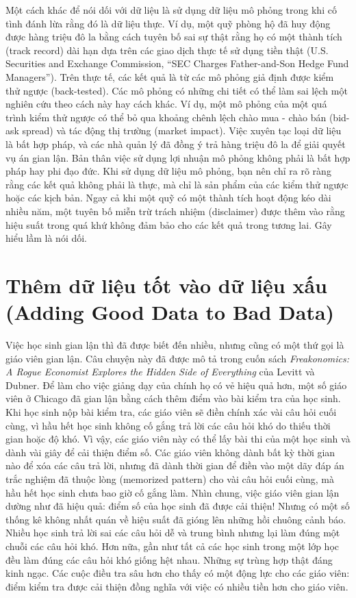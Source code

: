 Một cách khác để nói dối với dữ liệu là sử dụng dữ liệu mô phỏng trong khi cố tình đánh lừa rằng đó là dữ liệu thực. Ví dụ, một quỹ phòng hộ đã huy động được hàng triệu đô la bằng cách tuyên bố sai sự thật rằng họ có một thành tích (track record) dài hạn dựa trên các giao dịch thực tế sử dụng tiền thật (U.S. Securities and Exchange Commission, ``SEC Charges Father-and-Son Hedge Fund Managers''). Trên thực tế, các kết quả là từ các mô phỏng giả định được kiểm thử ngược (back-tested). Các mô phỏng có những chi tiết có thể làm sai lệch một nghiên cứu theo cách này hay cách khác. Ví dụ, một mô phỏng của một quá trình kiểm thử ngược có thể bỏ qua khoảng chênh lệch chào mua - chào bán (bid-ask spread) và tác động thị trường (market impact). Việc xuyên tạc loại dữ liệu là bất hợp pháp, và các nhà quản lý đã đồng ý trả hàng triệu đô la để giải quyết vụ án gian lận. Bản thân việc sử dụng lợi nhuận mô phỏng không phải là bất hợp pháp hay phi đạo đức. Khi sử dụng dữ liệu mô phỏng, bạn nên chỉ ra rõ ràng rằng các kết quả không phải là thực, mà chỉ là sản phẩm của các kiểm thử ngược hoặc các kịch bản. Ngay cả khi một quỹ có một thành tích hoạt động kéo dài nhiều năm, một tuyên bố miễn trừ trách nhiệm (disclaimer) được thêm vào rằng hiệu suất trong quá khứ không đảm bảo cho các kết quả trong tương lai. Gây hiểu lầm là nói dối.

\section{Thêm dữ liệu tốt vào dữ liệu xấu (Adding Good Data to Bad Data)}

Việc học sinh gian lận thì đã được biết đến nhiều, nhưng cũng có một thứ gọi là giáo viên gian lận. Câu chuyện này đã được mô tả trong cuốn sách \emph{Freakonomics: A Rogue Economist Explores the Hidden Side of Everything} của Levitt và Dubner. Để làm cho việc giảng dạy của chính họ có vẻ hiệu quả hơn, một số giáo viên ở Chicago đã gian lận bằng cách thêm điểm vào bài kiểm tra của học sinh. Khi học sinh nộp bài kiểm tra, các giáo viên sẽ điền chính xác vài câu hỏi cuối cùng, vì hầu hết học sinh không cố gắng trả lời các câu hỏi khó do thiếu thời gian hoặc độ khó. Vì vậy, các giáo viên này có thể lấy bài thi của một học sinh và dành vài giây để cải thiện điểm số. Các giáo viên không dành bất kỳ thời gian nào để xóa các câu trả lời, nhưng đã dành thời gian để điền vào một dãy đáp án trắc nghiệm đã thuộc lòng (memorized pattern) cho vài câu hỏi cuối cùng, mà hầu hết học sinh chưa bao giờ cố gắng làm. Nhìn chung, việc giáo viên gian lận dường như đã hiệu quả: điểm số của học sinh đã được cải thiện! Nhưng có một số thống kê không nhất quán về hiệu suất đã gióng lên những hồi chuông cảnh báo. Nhiều học sinh trả lời sai các câu hỏi dễ và trung bình nhưng lại làm đúng một chuỗi các câu hỏi khó. Hơn nữa, gần như tất cả các học sinh trong một lớp học đều làm đúng các câu hỏi khó giống hệt nhau. Những sự trùng hợp thật đáng kinh ngạc. Các cuộc điều tra sâu hơn cho thấy có một động lực cho các giáo viên: điểm kiểm tra được cải thiện đồng nghĩa với việc có nhiều tiền hơn cho giáo viên.


